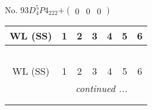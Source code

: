 \documentclass[fleqn,9pt,landscape]{jsarticle}
\begin{document}
\newpage
No. 93\quad$D_{4}^{5}$\quad$P4_222$\quad[ tetragonal ]\quad$+\begin{pmatrix} 0 & 0 & 0 \end{pmatrix}$
\begin{center}
\renewcommand{\arraystretch}{1.2}
\begin{longtable}{ccccccc}
 \hline \hline
WL (SS) & 1 & 2 & 3 & 4 & 5 & 6 \\ \hline \endfirsthead

\multicolumn{6}{l}{\tablename\ \thetable{}} \\
 \hline \hline
WL (SS) & 1 & 2 & 3 & 4 & 5 & 6 \\ \hline \endhead

 \hline \hline
\multicolumn{6}{r}{\footnotesize\it continued ...} \\ \endfoot

 \hline \hline
\multicolumn{6}{r}{} \\ \endlastfoot


\end{longtable}
\end{center}
\end{document}
